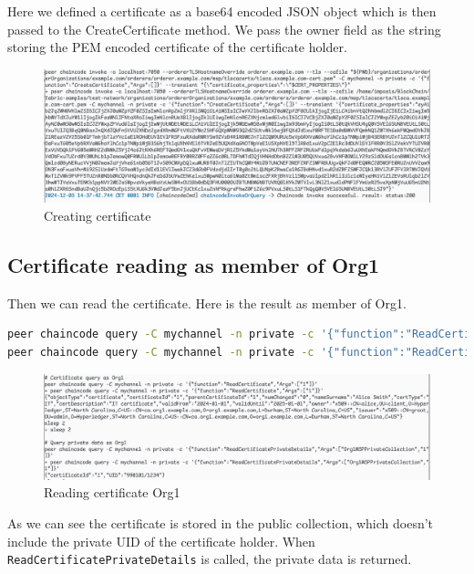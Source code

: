 \documentclass[12pt]{article}
\begin{document}
Here we defined a certificate as a base64 encoded JSON object which is then passed to the CreateCertificate method.
We pass the owner field as the string storing the PEM encoded certificate of the certificate holder.

\begin{figure}[H]
    \centering
    \includegraphics[width=\textwidth]{imgs/creating_certificate.PNG}
    \caption{Creating certificate}
    \label{fig:creatingcertificate}
\end{figure}

\subsection{Certificate reading as member of Org1}

Then we can read the certificate. Here is the result as member of Org1.

\begin{lstlisting}[language=bash]
peer chaincode query -C mychannel -n private -c '{"function":"ReadCertificate","Args":["1"]}'
peer chaincode query -C mychannel -n private -c '{"function":"ReadCertificatePrivateDetails","Args":["Org1MSPPrivateCollection","1"]}'
\end{lstlisting}

\begin{figure}[H]
    \centering
    \includegraphics[width=\textwidth]{imgs/reading_certificate_org1.PNG}
    \caption{Reading certificate Org1}
    \label{fig:readingcertificate}
\end{figure}

As we can see the certificate is stored in the public collection, which doesn't include the private UID of the certificate holder.
When \texttt{ReadCertificatePrivateDetails} is called, the private data is returned.
\end{document}

